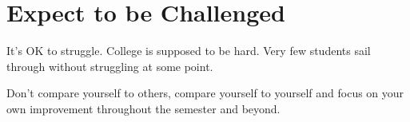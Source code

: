 \documentclass[12pt]{scrartcl}
\begin{document}
\section{Expect to be Challenged}
It's OK to struggle. College is supposed to be hard. Very few students 
sail through without struggling at some point.

Don't compare yourself to others, compare yourself to yourself and focus
on your own improvement throughout the semester and beyond.
\end{document}
